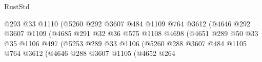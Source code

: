 \begin{lexlean}{RustStd}
\begin{coremodule}
{\begin{coremodule}
{{{{{{{{{{{{{{                                              @293
                                              @33
                                              @1110
                                              (@5260
                                                @292
                                                @3607
                                                @484
                                                @1109
                                                @764
                                                @3612
                                                (@4646
                                                  @292
                                                  @3607
                                                  @1109
                                                  (@4685
                                                    @291
                                                    @32
                                                    @36
                                                    @575
                                                    @1108
                                                    @4698
                                                    (@4651
                                                      @289
                                                      @50
                                                      @33
                                                      @35
                                                      @1106
                                                      @497
                                                      (@5253
                                                        @289
                                                        @33
                                                        @1106
                                                        (@5260
                                                          @288
                                                          @3607
                                                          @484
                                                          @1105
                                                          @764
                                                          @3612
                                                          (@4646
                                                            @288
                                                            @3607
                                                            @1105
                                                            (@4652
                                                              @264
}}}}}}}}}}}}}}
\end{coremodule}}
\end{coremodule}
\end{lexlean}
